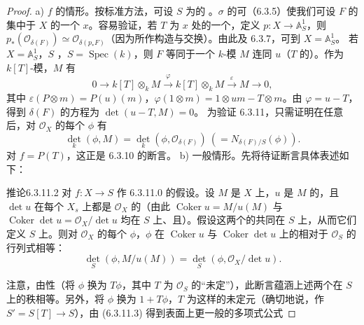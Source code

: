 \begin{proof}
a) $f$ 的情形。按标准方法，可设 $S$ 为的 。$\sigma$ 的可（6.3.5）使我们可设 $F$ 的集中于 $X$ 的一个 $x$。容易验证，若 $T$ 为 $x$ 处的一个，定义 $p:X\to\mathbb A_S^1$，则 $p_*(\mathcal O_{\delta(F)})\simeq\mathcal O_{\delta(p_*F)}$（因为所作构造与交换）。由此及 6.3.7，可到 $X=\mathbb A_S^1$。
若 $X=\mathbb A_S^1$，$S$ ，$S=\operatorname{Spec}(k)$，则 $F$ 等同于一个 $k$-模 $M$ 连同 $u$（$T$ 的）。作为 $k[T]$-模，$M$ 有
\[0\longrightarrow k[T]\otimes_kM\xrightarrow{\varphi}k[T]\otimes_kM\xrightarrow{\varepsilon}M\longrightarrow0,\]
其中 $\varepsilon(P\otimes m)=P(u)(m)$，$\varphi(1\otimes m)=1\otimes um-T\otimes m$。由 $\varphi=u-T$，得到 $\delta(F)$ 的方程为 $\det(u-T,M)=0$。
为验证 6.3.11，只需证明在任意后，对 $\mathcal O_X$ 的每个 $\phi$ 有
\[\det_k(\phi,M)=\det_k(\phi,\mathcal O_{\delta(F)})\ (=N_{\delta(F)/S}(\phi)).\]
对 $f=P(T)$，这正是 6.3.10 的断言。
b) 一般情形。先将待证断言具体表述如下：
\begin{SGAresult}{推论}{6.3.11.2}
对 $f:X\to S$ 作 6.3.11.0 的假设。设 $M$ 是 $X$ 上，$u$ 是 $M$ 的，且 $\det u$ 在每个 $X_s$ 上都是 $\mathcal O_X$ 的（由此 $\operatorname{Coker}u=M/u(M)$ 与 $\operatorname{Coker}\det u=\mathcal O_X/\det u$ 均在 $S$ 上、且）。假设这两个的共同在 $S$ 上，从而它们定义 $S$ 上。则对 $\mathcal O_X$ 的每个 $\phi$，$\phi$ 在 $\operatorname{Coker}u$ 与 $\operatorname{Coker}\det u$ 上的相对于 $\mathcal O_S$ 的行列式相等：
\[\det_S(\phi,M/u(M))=\det_S(\phi,\mathcal O_X/\det u).\tag{6.3.11.3}\]
\end{SGAresult}
注意，由性（将 $\phi$ 换为 $T\phi$，其中 $T$ 为 $\mathcal O_S$ 的“未定”），此断言蕴涵上述两个在 $S$ 上的秩相等。另外，将 $\phi$ 换为 $1+T\phi$，$T$ 为这样的未定元（确切地说，作 $S'=S[T]\to S$），由 (6.3.11.3) 得到表面上更一般的多项式公式

\end{proof}
